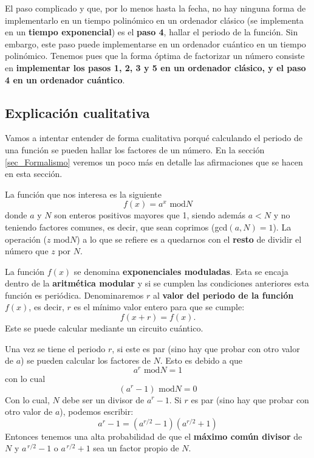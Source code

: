 \documentclass[a4paper,11pt]{book} %
\numberwithin{equation}{chapter}
\begin{document}
El paso complicado y que, por lo menos hasta la fecha, no hay ninguna forma de implementarlo en un tiempo polinómico en un ordenador clásico (se implementa en un \textbf{tiempo exponencial}) es el \textbf{paso 4}, hallar el periodo de la función. Sin embargo, este paso puede implementarse en un ordenador cuántico en un tiempo polinómico. Tenemos pues que la forma óptima de factorizar un número consiste en \textbf{implementar los pasos 1, 2, 3 y 5 en un ordenador clásico, y el paso 4 en un ordenador cuántico}. 


\subsection{Explicación cualitativa}

Vamos a intentar entender de forma cualitativa porqué calculando el periodo de una función se pueden hallar los factores de un número. En la sección \ref{sec_Formalismo} veremos un poco más en detalle las afirmaciones que se hacen en esta sección.

La función que nos interesa es la siguiente
\begin{equation}
f(x) = a^x \text{ mod} N
\end{equation}
donde $a$ y $N$ son enteros positivos mayores que 1, siendo además $a < N$ y no teniendo factores comunes, es decir, que sean coprimos (gcd$(a,N) = 1$). La operación ($z$ mod$N$) a lo que se refiere es a quedarnos con el \textbf{resto} de dividir el número que $z$ por $N$. 

La función $f(x)$ se denomina  \textbf{exponenciales moduladas}. Esta se encaja dentro de la \textbf{aritmética modular} y si se cumplen las condiciones anteriores esta función es periódica. Denominaremos $r$ al \textbf{valor del periodo de la función} $f(x)$, es decir, $r$ es el mínimo valor entero para que se cumple:
    	\begin{equation}
    	f(x+r) = f(x).
    	\end{equation}
Este se puede calcular mediante un circuito cuántico.

Una vez se tiene el periodo $r$, si este es par (sino hay que probar con otro valor de $a$) se pueden calcular los factores de $N$. Esto es debido a que 
	\begin{equation}
	a^r \text{ mod} N = 1
	\end{equation}
con lo cual
	\begin{equation}
	(a^r-1) \text{ mod} N = 0
	\end{equation}
Con lo cual, $N$ debe ser un divisor de $a^r-1$. Si $r$ es par (sino hay que probar con otro valor de $a$), podemos escribir:
	\begin{equation}
	a^r-1 = (a^{r/2}-1)(a^{r/2}+1)
	\end{equation}
Entonces tenemos una alta probabilidad de que el \textbf{máximo común divisor} de $N$ y $a^{\,r/2}-1$ o $a^{\,r/2}+1$ sea un factor propio de $N$.
\end{document}
